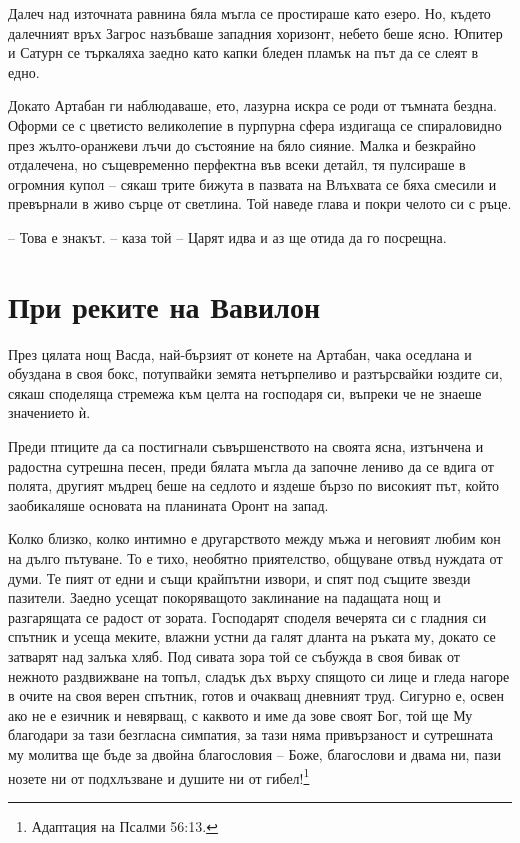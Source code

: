 Далеч над източната равнина бяла мъгла се простираше като езеро. Но, където
далечният връх Загрос назъбваше западния хоризонт, небето беше ясно. Юпитер и
Сатурн се търкаляха заедно като капки бледен пламък на път да се слеят в едно.

Докато Артабан ги наблюдаваше, ето, лазурна искра се роди от тъмната бездна.
Оформи се с цветисто великолепие в пурпурна сфера издигаща се спираловидно през
жълто-оранжеви лъчи до състояние на бяло сияние. Малка и безкрайно отдалечена,
но същевременно перфектна във всеки детайл, тя пулсираше в огромния купол --
сякаш трите бижута в пазвата на Влъхвата се бяха смесили и превърнали в живо
сърце от светлина. Той наведе глава и покри челото си с ръце.

-- Това е знакът. -- каза той -- Царят идва и аз ще отида да го посрещна.

\part{При реките на Вавилон}

През цялата нощ Васда, най-бързият от конете на Артабан, чака оседлана и
обуздана в своя бокс, потупвайки земята нетърпеливо и разтърсвайки юздите си,
сякаш споделяща стремежа към целта на господаря си, въпреки че не знаеше
значението ѝ.

Преди птиците да са постигнали съвършенството на своята ясна, изтънчена и
радостна сутрешна песен, преди бялата мъгла да започне лениво да се вдига от
полята, другият мъдрец беше на седлото и яздеше бързо по високият път, който
заобикаляше основата на планината Оронт на запад.

Колко близко, колко интимно е другарството между мъжа и неговият любим кон на
дълго пътуване. То е тихо, необятно приятелство, общуване отвъд нуждата от думи.
Те пият от едни и същи крайпътни извори, и спят под същите звезди пазители.
Заедно усещат покоряващото заклинание на падащата нощ и разгарящата се радост от
зората. Господарят споделя вечерята си с гладния си спътник и усеща меките,
влажни устни да галят дланта на ръката му, докато се затварят над залъка хляб.
Под сивата зора той се събужда в своя бивак от нежното раздвижване на топъл,
сладък дъх върху спящото си лице и гледа нагоре в очите на своя верен спътник,
готов и очакващ дневният труд. Сигурно е, освен ако не е езичник и невярващ, с
каквото и име да зове своят Бог, той ще Му благодари за тази безгласна симпатия,
за тази няма привързаност и сутрешната му молитва ще бъде за двойна благословия
-- Боже, благослови и двама ни, пази нозете ни от подхлъзване и душите ни от
гибел!\footnote{Адаптация на Псалми 56:13.}

